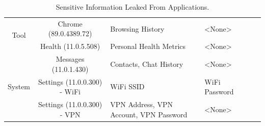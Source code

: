 \begin{table}[t]
\begin{tabular}{|c|c|l|l|c|c|}
		\hline
		\multirow{2}{*}{Tool}               & Chrome (89.0.4389.72)      & Browsing History                                	& <None> \\
											\cline{2-4}
		                					& Health (11.0.5.508)      & Personal Health Metrics      						& <None> \\
		\hline
		\multirow{3}{*}{System}             &  Messages (11.0.1.430)   & Contacts, Chat History				 &  <None> \\
											\cline{2-4}
											& Settings (11.0.0.300) - WiFi   & WiFi SSID                                	&  WiFi Password \\
											\cline{2-4}
		                					& Settings (11.0.0.300) - VPN    & VPN Address, VPN Account, VPN Password      						& <None> \\
		\hline
	\end{tabular}
	\linebreak
	\caption{Sensitive Information Leaked From Applications.}
	\label{table:information_extracted}
\end{table}


